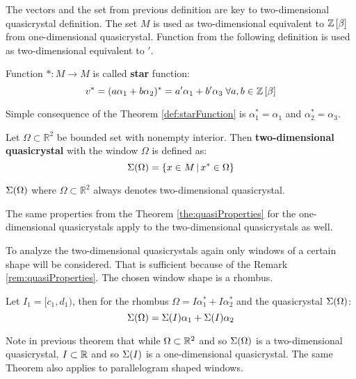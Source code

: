 \documentclass[text.tex]{subfiles}
\begin{document}
\begin{remark}
The vectors and the set from previous definition are key to two-dimensional quasicrystal definition. The set $M$ is used as two-dimensional equivalent to $\mathbb{Z}\left[\beta\right]$ from one-dimensional quasicrystal. Function from the following definition is used as two-dimensional equivalent to $'$.
\end{remark}

\begin{definition}
\label{def:starFunction}
Function $\ast: M \to M$ is called \textbf{star} function:
$$v^\ast = (a\alpha_1 + b\alpha_2)^\ast = a'\alpha_1 + b'\alpha_3 \;\forall a,b\in\mathbb{Z}\left[\beta\right]$$
\end{definition}

\begin{remark}
Simple consequence of the Theorem \ref{def:starFunction} is $\alpha_1^\ast = \alpha_1$ and $\alpha_2^\ast = \alpha_3$.
\end{remark}

\begin{definition}
Let $\Omega \subset \mathbb{R}^2$ be bounded set with nonempty interior. Then \textbf{two-dimensional quasicrystal} with the window $\Omega$ is defined as:
$$\Sigma(\Omega) = \left\{ x \in M\,|\,x^\ast \in \Omega \right\}$$
\end{definition}

\begin{remark}
$\Sigma(\Omega)$ where $\Omega \subset \mathbb{R}^2$ always denotes two-dimensional quasicrystal.
\end{remark}

\begin{remark}
\label{rem:quasiProperties}
The same properties from the Theorem \ref{the:quasiProperties} for the one-dimensional quasicrystals apply to the two-dimensional quasicrystals as well.
\end{remark}

To analyze the two-dimensional quasicrystals again only windows of a certain shape will be considered. That is sufficient because of the Remark \ref{rem:quasiProperties}. The chosen window shape is a rhombus. 

\begin{theorem}
\label{the:twoToOne}
Let $I_1 = [c_1,d_1)$, then for the rhombus $\Omega = I\alpha_1^\ast + I\alpha_2^\ast$ and the quasicrystal $\Sigma(\Omega)$: 
$$\Sigma(\Omega) = \Sigma(I)\alpha_1 + \Sigma(I)\alpha_2$$
\end{theorem}

\begin{remark}
Note in previous theorem that while $\Omega \subset \mathbb{R}^2$ and so $\Sigma(\Omega)$ is a two-dimensional quasicrystal, $I \subset \mathbb{R}$ and so $\Sigma(I)$ is a one-dimensional quasicrystal. 
The same Theorem also applies to parallelogram shaped windows. 
\end{remark}
\end{document}
